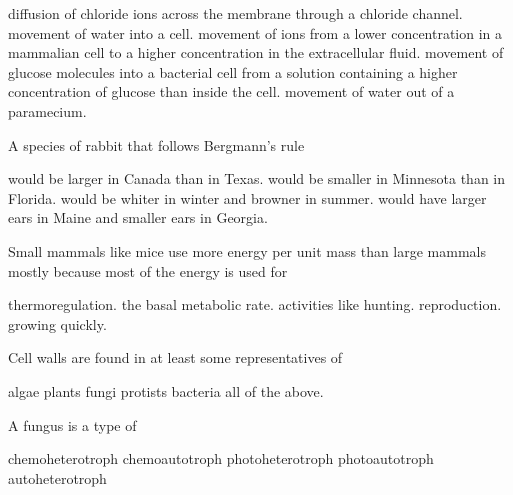 \begin{choices}
\choice diffusion of chloride ions across the membrane through a chloride channel. %
\choice movement of water into a cell. %
\correctchoice movement of  ions from a lower concentration in a mammalian cell to a higher concentration in the extracellular fluid. %
\choice movement of glucose molecules into a bacterial cell from a solution containing a higher concentration of glucose than inside the cell. %
\choice movement of water out of a paramecium. %
\end{choices}


\question
A species of rabbit that follows Bergmann's rule 

\begin{choices}
\correctchoice  would be larger in Canada than in Texas. %
\choice would be smaller in Minnesota than in Florida. %
\choice would be whiter in winter and browner in summer. %
\choice would have larger ears in Maine and smaller ears in Georgia. %
\end{choices}

\question
Small mammals like mice use more energy per unit mass than large mammals mostly because most of the energy is used for

\begin{choices}
\correctchoice thermoregulation. %
\choice the basal metabolic rate. %
\choice activities like hunting. %
\choice reproduction. %
\choice growing quickly. %
\end{choices}


\question
Cell walls are found in at least some representatives of  
\begin{choices}
\choice algae %
\choice plants %
\choice fungi %
\choice protists %
\choice bacteria %
\correctchoice all of the above.  %
\end{choices}



\question
A fungus is a type of 
\begin{choices}
\correctchoice chemoheterotroph %
\choice chemoautotroph %
\choice  photoheterotroph %
\choice  photoautotroph %
\choice  autoheterotroph %
\end{choices}

